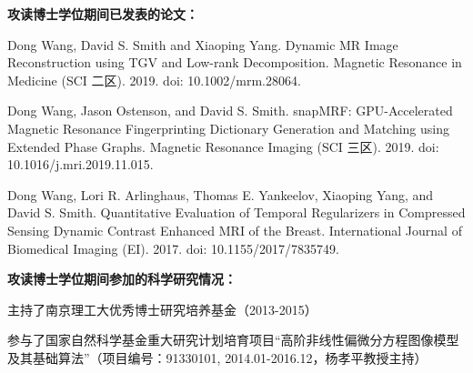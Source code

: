 \begin{publications}{99}
%


\item[] {\songti{}\bf{攻读博士学位期间已发表的论文：}}
\item Dong Wang, David S. Smith and Xiaoping Yang. Dynamic MR Image Reconstruction using TGV and Low-rank Decomposition. Magnetic Resonance in Medicine (SCI 二区). 2019. doi: 10.1002/mrm.28064.
\item Dong Wang, Jason Ostenson, and David S. Smith. snapMRF: GPU-Accelerated Magnetic Resonance Fingerprinting Dictionary Generation and Matching using Extended Phase Graphs. Magnetic Resonance Imaging (SCI 三区). 2019. doi: 10.1016/j.mri.2019.11.015.
\item Dong Wang, Lori R. Arlinghaus, Thomas E. Yankeelov, Xiaoping Yang, and David S. Smith. Quantitative Evaluation of Temporal Regularizers in Compressed Sensing Dynamic Contrast Enhanced MRI of the Breast. International Journal of Biomedical Imaging (EI). 2017. doi: 10.1155/2017/7835749.

\vspace{1.0cm}
\item[] {\songti{}\bf{攻读博士学位期间参加的科学研究情况：}}
\setcounter{enumiv}{0}
\item \texttt{}主持了南京理工大优秀博士研究培养基金（2013-2015）
\item \texttt{}参与了国家自然科学基金重大研究计划培育项目“高阶非线性偏微分方程图像模型及其基础算法”（项目编号：91330101, 2014.01-2016.12，杨孝平教授主持）

\end{publications}
